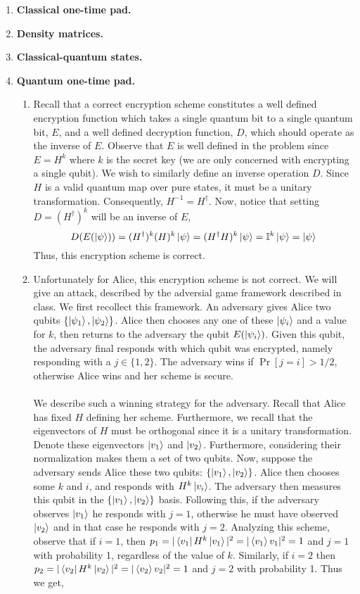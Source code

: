 \documentclass[12pt]{article}
\begin{document}
\begin{enumerate}
\item {\bf Classical one-time pad.}\\


\item {\bf Density matrices.}\\



\item {\bf Classical-quantum states.}\\


\item {\bf Quantum one-time pad.}
\begin{enumerate}
\item
Recall that a correct encryption scheme constitutes a well defined encryption function which takes a single quantum bit to a single quantum bit, $E$, and a well defined decryption function, $D$, which should operate as the inverse of $E$. Observe that $E$ is well defined in the problem since $E = H^k$ where $k$ is the secret key (we are only concerned with encrypting a single qubit). We wish to similarly define an inverse operation $D$. Since $H$ is a valid quantum map over pure states, it must be a unitary transformation. Consequently, $H^{-1} = H^\dagger$. Now, notice that setting $D = (H^\dagger)^k$ will be an inverse of $E$,
$$ D(E(\ket{\psi})) = (H^\dagger)^k (H)^k \ket{\psi} = (H^\dagger H)^k \ket{\psi} = \mathbb{I}^k \ket{\psi} = \ket{\psi}$$
Thus, this encryption scheme is correct.
\item
Unfortunately for Alice, this encryption scheme is not correct. We will give an attack, described by the adversial game framework described in class. We first recollect this framework. An adversary gives Alice two qubits $\{\ket{\psi_1},\ket{\psi_2}\}$. Alice then chooses any one of these $\ket{\psi_i}$ and a value for $k$, then returns to the adversary the qubit $E(\ket{\psi_i})$. Given this qubit, the adversary final responds with which qubit was encrypted, namely responding with a $j \in \{1,2\}$. The adversary wins if $\Pr[j =i ] > 1/2$, otherwise Alice wins and her scheme is secure.\\ \\
We describe such a winning strategy for the adversary. Recall that Alice has fixed $H$ defining her scheme. Furthermore, we recall that the eigenvectors of $H$ must be orthogonal since it is a unitary transformation. Denote these eigenvectors $\ket{v_1}$ and $\ket{v_2}$. Furthermore, considering their normalization makes them a set of two qubits. Now, suppose the adversary sends Alice these two qubits: $\{\ket{v_1}, \ket{v_2}\}$. Alice then chooses some $k$ and $i$, and responds with $H^k \ket{v_i}$. The adversary then measures this qubit in the $\{\ket{v_1}, \ket{v_2}\}$ basis. Following this, if the adversary observes $\ket{v_1}$ he responds with $j = 1$, otherwise he must have observed $\ket{v_2}$ and in that case he responds with $j = 2$. Analyzing this scheme, observe that if $i = 1$, then $p_1 = |\bra{v_1}H^k \ket{v_1}|^2 = |\braket{v_1}{v_1}|^2 = 1$ and $j = 1$ with probability 1, regardless of the value of $k$. Similarly, if $i = 2$ then $p_2 = |\bra{v_2}H^k \ket{v_2}|^2 = |\braket{v_2}{v_2}|^2 = 1$ and $j = 2$ with probability 1. Thus we get,

\end{enumerate}
\end{enumerate}
\end{document}
